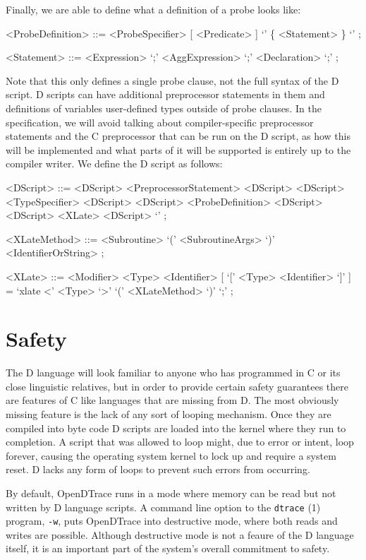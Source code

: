 \noindent
Finally, we are able to define what a definition of a probe looks like:
\begin{grammar}
<ProbeDefinition> ::= <ProbeSpecifier> [ <Predicate> ] `{'  \{ <Statement> \} `}' ;

<Statement> ::=  <Expression> `;'
            \alt <AggExpression> `;'
            \alt <Declaration> `;' ;
\end{grammar}

\noindent
Note that this only defines a single probe clause, not the full syntax of the D script.
D scripts can have additional preprocessor statements in them and definitions of variables
user-defined types outside of probe clauses. In the specification, we will avoid talking about
compiler-specific preprocessor statements and the C preprocessor that can be run on the D
script, as how this will be implemented and what parts of it will be supported is entirely
up to the compiler writer. We define the D script as follows:
\begin{grammar}
<DScript> ::=  <DScript> <PreprocessorStatement> <DScript>
          \alt <DScript> <TypeSpecifier> <DScript>
          \alt <DScript> <ProbeDefinition> <DScript>
          \alt <DScript> <XLate>  <DScript>
          \alt `' ;

<XLateMethod> ::=  <Subroutine> `(' <SubroutineArgs> `)'
              \alt <IdentifierOrString> ;

<XLate> ::= <Modifier> <Type> <Identifier> [ `[' <Type> <Identifier> `]' ] = `xlate <' <Type> `>' `(' <XLateMethod> `)' `;' ;
\end{grammar}

\section{Safety}
\label{sec:safety}

The D language will look familiar to anyone who has programmed in C or
its close linguistic relatives, but in order to provide certain
safety guarantees there are features of C like languages that are
missing from D.  The most obviously missing feature is the lack of any
sort of looping mechanism.  Once they are compiled into byte code D
scripts are loaded into the kernel where they run to completion.  A
script that was allowed to loop might, due to error or intent, loop
forever, causing the operating system kernel to lock up and require a
system reset.  D lacks any form of loops to prevent such errors from
occurring.

By default, OpenDTrace runs in a mode where memory can be read but not
written by D language scripts.  A command line option to the \texttt{dtrace} (1)
program, \texttt{-w}, puts OpenDTrace into destructive mode, where both reads
and writes are possible.  Although destructive mode is not a feaure of
the D language itself, it is an important part of the system's overall
commitment to safety.

